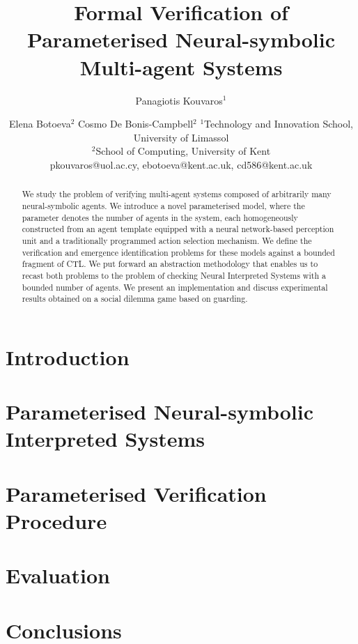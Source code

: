 \documentclass{article}
\title{Formal Verification of  Parameterised Neural-symbolic Multi-agent Systems}
\author{
Panagiotis Kouvaros$^1$
\and
Elena Botoeva$^2$\And
Cosmo De Bonis-Campbell$^{2}$
\affiliations
$^1$Technology and Innovation School, University of Limassol\\
$^2$School of Computing, University of Kent\\
\emails
pkouvaros@uol.ac.cy,
ebotoeva@kent.ac.uk,
cd586@kent.ac.uk
}
\begin{document}
\maketitle

\begin{abstract}

We study the problem of verifying multi-agent systems
    composed of arbitrarily many neural-symbolic agents. We
    introduce a novel parameterised model, where the
    parameter denotes the number of agents in the system,
    each homogeneously constructed from an agent template
    equipped with a neural network-based perception unit
    and a traditionally programmed action selection
    mechanism. We define the verification and emergence
    identification problems for these models against a
    bounded fragment of CTL. We put forward an abstraction
    methodology that enables us to recast both problems to
    the problem of checking Neural Interpreted Systems with
    a bounded number of agents. We present an implementation
    and discuss experimental results obtained on a social
    dilemma game based on guarding.

\end{abstract}

\section{Introduction}
\label{sec:intro}


\section{Parameterised Neural-symbolic Interpreted Systems}
\label{sec:pnis}


\section{Parameterised Verification Procedure}
\label{sec:verification}


\section{Evaluation}
\label{sec:eval}


\section{Conclusions}
\label{sec:conclusions}







%
\end{document}
